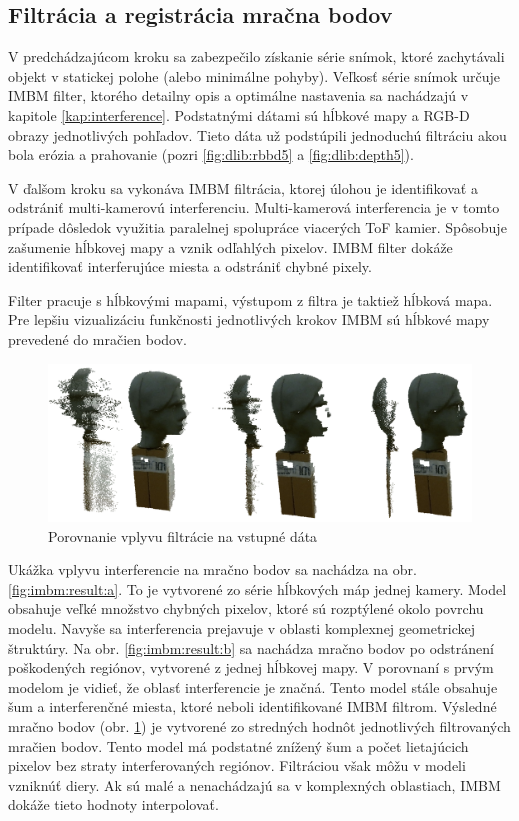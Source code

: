   

\subsection{Filtrácia a registrácia mračna bodov}

V predchádzajúcom kroku sa zabezpečilo získanie série snímok, ktoré zachytávali objekt v statickej polohe (alebo minimálne pohyby). Veľkosť série snímok určuje IMBM filter, ktorého detailny opis a optimálne nastavenia sa nachádzajú v kapitole \ref{kap:interference}. Podstatnými dátami sú hĺbkové mapy a RGB-D obrazy jednotlivých pohľadov. Tieto dáta už podstúpili jednoduchú filtráciu akou bola erózia a prahovanie (pozri \ref{fig:dlib:rbbd5} a \ref{fig:dlib:depth5}). 

V ďalšom kroku sa vykonáva IMBM filtrácia, ktorej úlohou je identifikovať a odstrániť multi-kamerovú interferenciu. Multi-kamerová interferencia je v tomto prípade dôsledok využitia paralelnej spolupráce viacerých ToF kamier. Spôsobuje zašumenie hĺbkovej mapy a vznik odľahlých pixelov. IMBM filter dokáže identifikovať interferujúce miesta a odstrániť chybné pixely. 

Filter pracuje s hĺbkovými mapami, výstupom z filtra je taktiež hĺbková mapa. Pre lepšiu vizualizáciu funkčnosti jednotlivých krokov IMBM sú hĺbkové mapy prevedené do mračien bodov.  

\begin{figure}[H]
	\centering
	\includegraphics[width=\textwidth]{figures/prepared_models.png}
	\caption{Porovnanie vplyvu filtrácie na vstupné dáta}
	\label{fig:imbm:result:a}
	\label{fig:imbm:result:b}
	\label{fig:imbm:result:c}
\end{figure}

Ukážka vplyvu interferencie na mračno bodov sa nachádza na obr. \ref{fig:imbm:result:a}. To je vytvorené zo série hĺbkových máp jednej kamery. Model obsahuje veľké množstvo chybných pixelov, ktoré sú rozptýlené okolo povrchu modelu. Navyše sa interferencia prejavuje v oblasti komplexnej geometrickej štruktúry. 
Na obr. \ref{fig:imbm:result:b} sa nachádza mračno bodov po odstránení poškodených regiónov, vytvorené z jednej hĺbkovej mapy. V porovnaní s prvým modelom je vidieť, že oblasť interferencie je značná. Tento model stále obsahuje šum a interferenčné miesta, ktoré neboli identifikované IMBM filtrom.  
Výsledné mračno bodov (obr. \ref{fig:imbm:result:c}) je vytvorené zo stredných hodnôt jednotlivých filtrovaných mračien bodov. Tento model má podstatné znížený šum a počet lietajúcich pixelov bez straty interferovaných regiónov. Filtráciou však môžu v modeli vzniknúť diery. Ak sú malé a nenachádzajú sa v komplexných oblastiach, IMBM dokáže tieto hodnoty interpolovať. 

